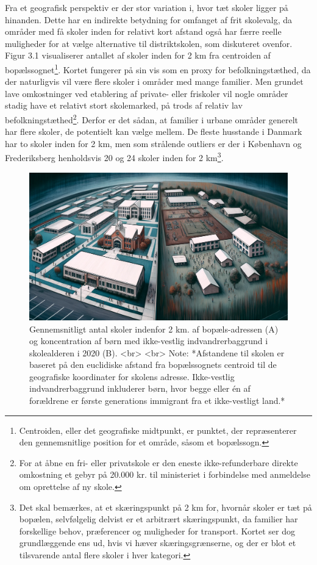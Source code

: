 \documentclass[
]{book}
\begin{document}
Fra et geografisk perspektiv er der stor variation i, hvor tæt skoler ligger på hinanden. Dette har en indirekte betydning for omfanget af frit skolevalg, da områder med få skoler inden for relativt kort afstand også har færre reelle muligheder for at vælge alternative til distriktskolen, som diskuteret ovenfor. Figur 3.1 visualiserer antallet af skoler inden for 2 km fra centroiden af bopælssognet\footnote{Centroiden, eller det geografiske midtpunkt, er punktet, der repræsenterer den gennemsnitlige position for et område, såsom et bopælssogn.}. Kortet fungerer på sin vis som en proxy for befolkningstæthed, da der naturligvis vil være flere skoler i områder med mange familier. Men grundet lave omkostninger ved etablering af private- eller friskoler vil nogle områder stadig have et relativt stort skolemarked, på trods af relativ lav befolkningstæthed\footnote{For at åbne en fri- eller privatskole er den eneste ikke-refunderbare direkte omkostning et gebyr på 20.000 kr. til ministeriet i forbindelse med anmeldelse om oprettelse af ny skole.}. Derfor er det sådan, at familier i urbane områder generelt har flere skoler, de potentielt kan vælge mellem. De fleste husstande i Danmark har to skoler inden for 2 km, men som strålende outliers er der i København og Frederiksberg henholdsvis 20 og 24 skoler inden for 2 km\footnote{Det skal bemærkes, at et skæringspunkt på 2 km for, hvornår skoler er tæt på bopælen, selvfølgelig delvist er et arbitrært skæringspunkt, da familier har forskellige behov, præferencer og muligheder for transport. Kortet ser dog grundlæggende ens ud, hvis vi hæver skæringsgrænserne, og der er blot et tilsvarende antal flere skoler i hver kategori.}.

\begin{figure}
\includegraphics[width=24.89in]{images/dalle-schoolseg} \caption{Gennemsnitligt antal skoler indenfor 2 km. af bopæls-adressen (A) og koncentration af børn med ikke-vestlig indvandrerbaggrund i skolealderen i 2020 (B). <br> <br> Note: *Afstandene til skolen er baseret på den euclidiske afstand fra bopælssognets centroid til de geografiske koordinater for skolens adresse. Ikke-vestlig indvandrerbaggrund inkluderer børn, hvor begge eller én af forældrene er første generations immigrant fra et ikke-vestligt land.*}\label{fig:fig-3-1}
\end{figure}
\end{document}
